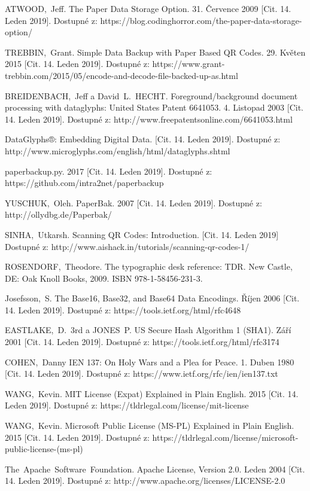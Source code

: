 \documentclass[conference]{IEEEtran}
\begin{document}
\begin{thebibliography}{1}
ATWOOD,~Jeff. The Paper Data Storage Option. 31. Července 2009 [Cit. 14. Leden 2019]. Dostupné z: https://blog.codinghorror.com/the-paper-data-storage-option/

TREBBIN,~Grant. Simple Data Backup with Paper Based QR Codes. 29. Květen 2015 [Cit. 14. Leden 2019]. Dostupné z: https://www.grant-trebbin.com/2015/05/encode-and-decode-file-backed-up-as.html  
	
BREIDENBACH,~Jeff a David~L.~HECHT. Foreground/background document processing with dataglyphs: United States Patent 6641053. 4. Listopad 2003 [Cit. 14. Leden 2019]. Dostupné z: http://www.freepatentsonline.com/6641053.html

DataGlyphs®: Embedding Digital Data. [Cit. 14. Leden 2019]. Dostupné z: http://www.microglyphs.com/english/html/dataglyphs.shtml
	
paperbackup.py. 2017 [Cit. 14. Leden 2019]. Dostupné z: https://github.com/intra2net/paperbackup
  
YUSCHUK,~Oleh. PaperBak. 2007 [Cit. 14. Leden 2019]. Dostupné z: http://ollydbg.de/Paperbak/

SINHA,~Utkarsh. Scanning QR Codes: Introduction. [Cit. 14. Leden 2019] Dostupné z: http://www.aishack.in/tutorials/scanning-qr-codes-1/
  
ROSENDORF,~Theodore. The typographic desk reference: TDR. New Castle, DE: Oak Knoll Books, 2009. ISBN 978-1-58456-231-3.

Josefsson,~S. The Base16, Base32, and Base64 Data Encodings. Říjen 2006 [Cit. 14. Leden 2019]. Dostupné z: https://tools.ietf.org/html/rfc4648

EASTLAKE,~D.~3rd a JONES~P. US Secure Hash Algorithm 1 (SHA1). Září 2001 [Cit. 14. Leden 2019]. Dostupné z: https://tools.ietf.org/html/rfc3174

COHEN,~Danny IEN 137: On Holy Wars and a Plea for Peace. 1. Duben 1980 [Cit. 14. Leden 2019]. Dostupné z: https://www.ietf.org/rfc/ien/ien137.txt

WANG,~Kevin. MIT License (Expat) Explained in Plain English. 2015 [Cit. 14. Leden 2019]. Dostupné z: https://tldrlegal.com/license/mit-license

WANG,~Kevin. Microsoft Public License (MS-PL) Explained in Plain English. 2015 [Cit. 14. Leden 2019]. Dostupné z: https://tldrlegal.com/license/microsoft-public-license-(ms-pl)

The~Apache~Software~Foundation. Apache License, Version 2.0. Leden 2004 [Cit. 14. Leden 2019]. Dostupné z: http://www.apache.org/licenses/LICENSE-2.0

\end{thebibliography}
\end{document}
